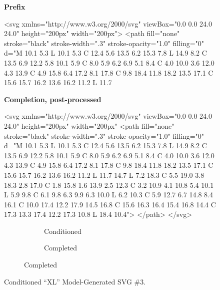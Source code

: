 \documentclass[11pt]{article}
\begin{document}
\begin{figure}[htbp]
	\centering

	\begin{minipage}[t]{.48\linewidth}

		\begin{center}
			\textbf{Prefix}
		\end{center}

		<svg xmlns="http://www.w3.org/2000/svg" viewBox="0.0 0.0 24.0 24.0" height="200px" width="200px">
		<path fill="none" stroke="black" stroke-width=".3" stroke-opacity="1.0" filling="0" d="M 10.1 5.3 L 10.1
		5.3 C 12.4 5.6 13.5 6.2 15.3 7.8 L 14.9 8.2 C 13.5 6.9 12.2 5.8 10.1 5.9 C 8.0 5.9 6.2 6.9 5.1 8.4 C 4.0
		10.0 3.6 12.0 4.3 13.9 C 4.9 15.8 6.4 17.2 8.1 17.8 C 9.8 18.4 11.8 18.2 13.5 17.1 C 15.6 15.7 16.2 13.6
		16.2 11.2 L 11.7
	\end{minipage}
	\hspace{1ex}
	\begin{minipage}[t]{.48\linewidth}
		\begin{center}
			\textbf{Completion, post-processed}
		\end{center}

		<svg xmlns="http://www.w3.org/2000/svg" viewBox="0.0 0.0 24.0 24.0" height="200px" width="200px"
		<path fill="none" stroke="black" stroke-width=".3" stroke-opacity="1.0" filling="0" d="M 10.1 5.3 L 10.1
		5.3 C 12.4 5.6 13.5 6.2 15.3 7.8 L 14.9 8.2 C 13.5 6.9 12.2 5.8 10.1 5.9 C 8.0 5.9 6.2 6.9 5.1 8.4 C 4.0
		10.0 3.6 12.0 4.3 13.9 C 4.9 15.8 6.4 17.2 8.1 17.8 C 9.8 18.4 11.8 18.2 13.5 17.1 C 15.6 15.7 16.2 13.6
		16.2 11.2 L 11.7 14.7 L 7.2 18.3 C 5.5 19.0 3.8 18.3 2.8 17.0 C 1.8 15.8 1.6 13.9 2.5 12.3 C 3.2 10.9 4.1
		10.8 5.4 10.1 L 5.9 9.8 C 6.1 9.8 6.3 9.9 6.3 10.0 L 6.2 10.3 C 5.9 12.7 6.7 14.8 8.4 16.1 C 10.0 17.4
		12.2 17.9 14.5 16.8 C 15.6 16.3 16.4 15.4 16.8 14.4 C 17.3 13.3 17.4 12.2 17.3 10.8 L 18.4 10.4"> </path> </svg>


	\end{minipage}
	\hfill
	\begin{subfigure}[b]{\linewidth}
		\centering
		\begin{subfigure}[b]{.4\textwidth}
			\centering
			
			\caption{Conditioned}
		\end{subfigure}
		\begin{subfigure}[b]{.4\textwidth}
			\centering
			
			\caption{Completed}
		\end{subfigure}
	\end{subfigure}

	\caption{Conditioned ``XL'' Model-Generated SVG \#3.}
	\label{Conditioned_2}
\end{figure}
\end{document}
